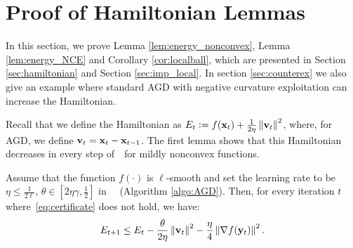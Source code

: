 
\section{Proof of Hamiltonian Lemmas}
In this section, we prove Lemma \ref{lem:energy_nonconvex}, Lemma \ref{lem:energy_NCE} and Corollary \ref{cor:localball}, which are presented in Section \ref{sec:hamiltonian} and 
Section \ref{sec:imp_local}.  In section \ref{sec:counterex} we also give an example 
where standard AGD with negative curvature exploitation can increase the Hamiltonian.


Recall that we define the Hamiltonian as $E_t \mathrel{\mathop:}= f(\mathbf{x}_{t}) + \frac{1}{2\eta}\left\|{\mathbf{v}_{t}}\right\|^2$, where, for AGD, we define $\mathbf{v}_t = \mathbf{x}_t - \mathbf{x}_{t-1}$.
The first lemma shows that this Hamiltonian decreases in every step of~\nag~for mildly nonconvex functions.

\begingroup
\def\thetheorem{\ref{lem:energy_nonconvex}}
\begin{lemma}
  Assume that the function $f(\cdot)$ is $\ell$-smooth and set the learning rate to
be $\eta \le \frac{1}{2\ell}$, $\theta\in [2\eta \gamma,\frac{1}{2}]$ in ~\nag~(Algorithm \ref{algo:AGD}). Then, for every iteration $t$ where~\eqref{eq:certificate} does not hold, we have:
  \begin{equation*}
  E_{t+1} \le E_t - \frac{\theta}{2\eta}\left\|{\mathbf{v}_t}\right\|^2 - \frac{\eta}{4}\left\|{\nabla f(\mathbf{y}_{t})}\right\|^2.
  \end{equation*}
\end{lemma}
\addtocounter{theorem}{-1}
\endgroup


